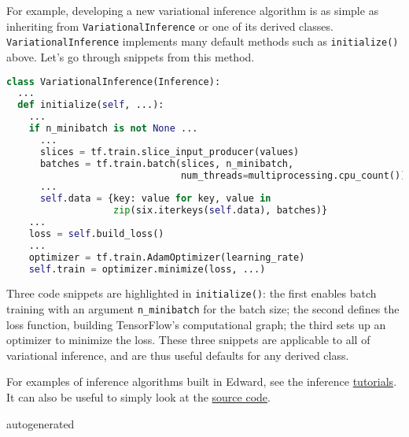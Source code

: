 For example, developing a new variational inference algorithm is as simple as
inheriting from \texttt{VariationalInference} or one of its derived
classes. \texttt{VariationalInference} implements many default methods such
as \texttt{initialize()} above. Let's go through snippets from this method.

\begin{lstlisting}[language=Python]
class VariationalInference(Inference):
  ...
  def initialize(self, ...):
    ...
    if n_minibatch is not None ...
      ...
      slices = tf.train.slice_input_producer(values)
      batches = tf.train.batch(slices, n_minibatch,
                               num_threads=multiprocessing.cpu_count())
      ...
      self.data = {key: value for key, value in
                   zip(six.iterkeys(self.data), batches)}
    ...
    loss = self.build_loss()
    ...
    optimizer = tf.train.AdamOptimizer(learning_rate)
    self.train = optimizer.minimize(loss, ...)
\end{lstlisting}

Three code snippets are highlighted in \texttt{initialize()}: the first
enables batch training with an argument \texttt{n_minibatch} for the batch
size; the second defines the loss function, building TensorFlow's
computational graph; the third sets up an optimizer to minimize the
loss. These three snippets are applicable to all of variational
inference, and are thus useful defaults for any derived class.

For examples of inference algorithms built in Edward, see the inference
\href{/tutorials/}{tutorials}. It can also be useful to simply look at
the
\href{https://github.com/blei-lab/edward/tree/master/edward/inferences}
{source code}.

{{autogenerated}}

